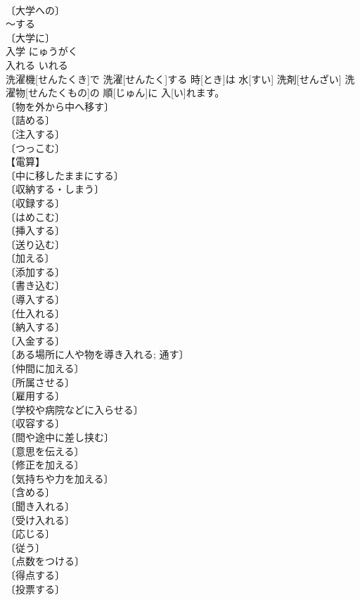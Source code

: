 \documentclass[8pt]{extreport}
\begin{document}
\begin{CJK}{UTF8}{min}
\\	〔大学への〕 
\\	～する 
\\	〔大学に〕 
\\	入学	にゅうがく	
\\	入れる	いれる	
\\	洗濯機[せんたくき]で 洗濯[せんたく]する 時[とき]は 水[すい] 洗剤[せんざい] 洗濯物[せんたくもの]の 順[じゅん]に 入[い]れます。	
\\	〔物を外から中へ移す〕 
\\	〔詰める〕 
\\	〔注入する〕 
\\	〔つっこむ〕 
\\	【電算】 
\\	〔中に移したままにする〕 
\\	〔収納する・しまう〕 
\\	〔収録する〕 
\\	〔はめこむ〕 
\\	〔挿入する〕 
\\	〔送り込む〕 
\\	〔加える〕 
\\	〔添加する〕 
\\	〔書き込む〕 
\\	〔導入する〕 
\\	〔仕入れる〕 
\\	〔納入する〕 
\\	〔入金する〕 
\\	〔ある場所に人や物を導き入れる; 通す〕 
\\	〔仲間に加える〕 
\\	〔所属させる〕 
\\	〔雇用する〕 
\\	〔学校や病院などに入らせる〕 
\\	〔収容する〕 
\\	〔間や途中に差し挟む〕 
\\	〔意思を伝える〕 
\\	〔修正を加える〕 
\\	〔気持ちや力を加える〕 
\\	〔含める〕 
\\	〔聞き入れる〕 
\\	〔受け入れる〕 
\\	〔応じる〕 
\\	〔従う〕 
\\	〔点数をつける〕 
\\	〔得点する〕 
\\	〔投票する〕 

\end{CJK}
\end{document}
